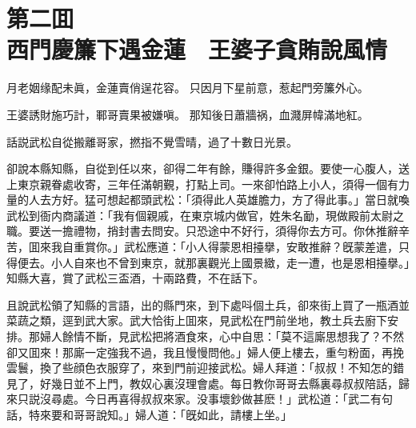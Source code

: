 
\chapter*{第二囬　\\西門慶簾下遇金蓮　王婆子貪賄說風情}


\begin{myquote}
月老姻缘配未眞，金蓮賣俏逞花容。
只因月下星前意，惹起門旁簾外心。

王婆誘財施巧計，鄆哥賣果被嫌嗔。
那知後日蕭牆祸，血濺屏幃滿地紅。
\end{myquote}

話説武松自從搬離哥家，撚指不覺雪晴，過了十數日光景。

卻說本縣知縣，自從到任以來，卻得二年有餘，賺得許多金銀。要使一心腹人，送上東京親眷處收寄，三年任滿朝覲，打點上司。一來卻怕路上小人，須得一個有力量的人去方好。猛可想起都頭武松：「須得此人英雄膽力，方了得此事。」當日就喚武松到衙内商議道：「我有個親戚，在東京城内做官，姓朱名勔，現做殿前太尉之職。要送一擔禮物，捎封書去問安。只恐途中不好行，須得你去方可。你休推辭辛苦，囬來我自重賞你。」武松應道：「小人得蒙恩相擡擧，安敢推辭？旣蒙差遣，只得便去。小人自來也不曾到東京，就那裏觀光上國景緻，走一遭，也是恩相擡擧。」知縣大喜，賞了武松三盃酒，十兩路費，不在話下。

且說武松領了知縣的言語，出的縣門來，到下處呌個土兵，卻來街上買了一瓶酒並菜蔬之類，逕到武大家。武大恰街上囬來，見武松在門前坐地，教土兵去廚下安排。那婦人餘情不斷，見武松把將酒食來，心中自思：「莫不這廝思想我了？不然卻又囬來！那廝一定強我不過，我且慢慢問他。」婦人便上樓去，重勻粉面，再挽雲鬟，換了些顔色衣服穿了，來到門前迎接武松。婦人拜道：「叔叔！不知怎的錯見了，好幾日並不上門，教奴心裏沒理會處。每日教你哥哥去縣裏尋叔叔陪話，歸來只説沒尋處。今日再喜得叔叔來家。没事壞鈔做甚麽！」武松道：「武二有句話，特來要和哥哥說知。」婦人道：「旣如此，請樓上坐。」

